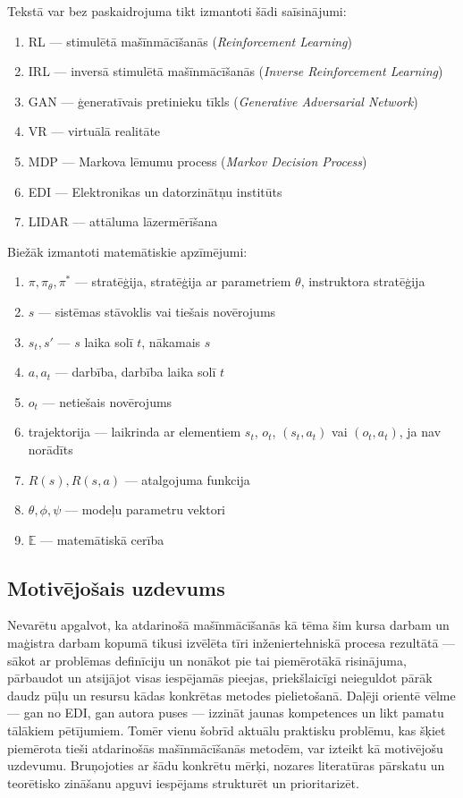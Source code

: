 \documentclass[12pt, a4paper]{article}
\numberwithin{equation}{section} %
\begin{document}
Tekstā var bez paskaidrojuma tikt izmantoti šādi saīsinājumi:

\begin{enumerate}
    \item RL --- stimulētā mašīnmācīšanās (\textit{Reinforcement Learning})
    \item IRL --- inversā stimulētā mašīnmācīšanās (\textit{Inverse Reinforcement Learning})
    \item GAN --- ģeneratīvais pretinieku tīkls (\textit{Generative Adversarial Network})
    \item VR --- virtuālā realitāte
    \item MDP --- Markova lēmumu process (\textit{Markov Decision Process})
    \item EDI --- Elektronikas un datorzinātņu institūts
    \item LIDAR --- attāluma lāzermērīšana
\end{enumerate}

Biežāk izmantoti matemātiskie apzīmējumi:

\begin{enumerate}
    \item $\pi, \pi_{\theta}, \pi^*$ --- stratēģija, stratēģija ar parametriem $\theta$, instruktora stratēģija
    \item $s$ --- sistēmas stāvoklis vai tiešais novērojums
    \item $s_t, s'$ --- $s$ laika solī $t$, nākamais $s$
    \item $a, a_t$ --- darbība, darbība laika solī $t$
    \item $o_t$ --- netiešais novērojums
    \item trajektorija --- laikrinda ar elementiem $s_t$, $o_t$, $(s_t, a_t)$ vai $(o_t, a_t)$, ja nav norādīts
    \item $R(s), R(s,a)$ --- atalgojuma funkcija
    \item $\theta, \phi, \psi$ --- modeļu parametru vektori
    \item $\mathbb{E}$ --- matemātiskā cerība
\end{enumerate}

\subsection{Motivējošais uzdevums}

Nevarētu apgalvot, ka atdarinošā mašīnmācīšanās kā tēma šim kursa darbam un maģistra darbam kopumā tikusi izvēlēta tīri inženiertehniskā procesa rezultātā --- sākot ar problēmas definīciju un nonākot pie tai piemērotākā risinājuma, pārbaudot un atsijājot visas iespējamās pieejas, priekšlaicīgi neieguldot pārāk daudz pūļu un resursu kādas konkrētas metodes pielietošanā. Daļēji orientē vēlme --- gan no EDI, gan autora puses --- izzināt jaunas kompetences un likt pamatu tālākiem pētījumiem. Tomēr vienu šobrīd aktuālu praktisku problēmu, kas šķiet piemērota tieši atdarinošās mašīnmācīšanās metodēm, var izteikt kā motivējošu uzdevumu. Bruņojoties ar šādu konkrētu mērķi, nozares literatūras pārskatu un teorētisko zināšanu apguvi iespējams strukturēt un prioritarizēt.
\end{document}
